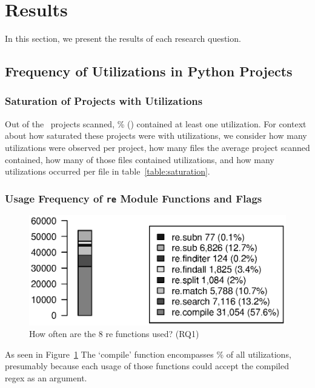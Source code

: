 \section{Results}
\label{sec:results}

In this section, we present the results of each research question. 

\subsection{Frequency of Utilizations in Python Projects}
\subsubsection{Saturation of Projects with Utilizations}
Out of the \ projects scanned, \% () contained at least one utilization.  For context about how saturated these projects were with utilizations, we consider how many utilizations were observed per project, how many files the average project scanned contained, how many of those files contained utilizations, and how many utilizations occurred per file in table~\ref{table:saturation}.



\subsubsection{Usage Frequency of {\tt re} Module Functions and Flags}

\begin{figure}[tb]
\centering
\includegraphics[width=\columnwidth]{../analysis_output/partFunctions.eps}
\caption{How often are the 8 re functions used? (RQ1)}
\label{fig:partFunctions}
\end{figure}

As seen in Figure~\ref{fig:partFunctions} The `compile' function encompasses \% of all utilizations, presumably because each usage of those functions could accept the compiled regex as an argument.

